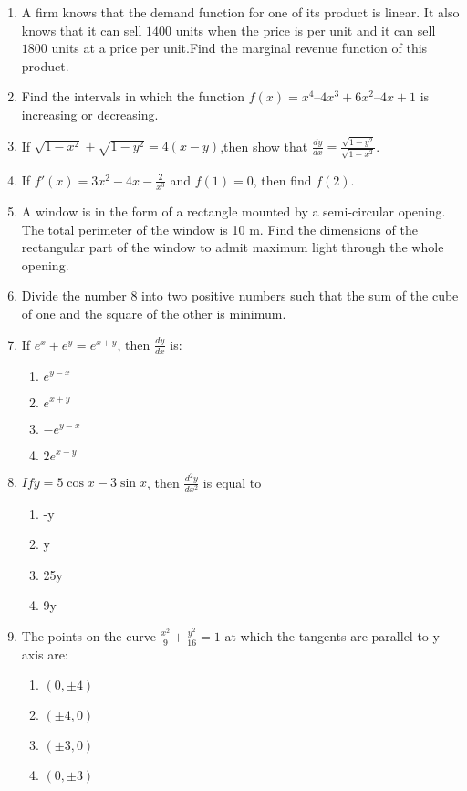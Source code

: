 \begin{enumerate}

\item A firm knows that the demand function for one of its product is linear. It also knows that it can sell $1400$ units when the price is  per unit and it can sell $1800$ units at a price  per unit.Find the marginal revenue function of this product.

\item Find the intervals in which the function $f(x) = x^{4}–4x^{3}+6x^{2}–4x+1$ is increasing or decreasing.

\item If $\sqrt{1-x^{2}}+\sqrt{1-y^{2}}=4(x-y)$,then show that $\frac{dy}{dx}=\frac{\sqrt{1-y^{2}}}{\sqrt{1-x^{2}}}$.


\item If $f'(x)=3x^{2}-4x-\frac{2}{x^{3}}$ and $f(1)=0$, then find $f(2)$.

\item A window is in the form of a rectangle mounted by a semi-circular opening. The total perimeter of the window is 10 m. Find the dimensions of the rectangular part of the window to admit maximum light through the whole opening.

\item Divide the number 8 into two positive numbers such that the sum of the cube of one and the square of the other is minimum.

\item If $e^{x}+e^{y}=e^{x+y}$, then $\frac{dy}{dx}$ is:
\begin{enumerate}
\item $e^{y-x}$
\item $e^{x+y}$
\item $-e^{y-x}$
\item $2 e^{x-y}$
\end{enumerate}

\item $If y=5\cos x-3\sin x$, then $\frac{d^{2}y}{dx^{2}}$ is equal to
\begin{enumerate}
\item -y
\item y
\item 25y
\item 9y
\end{enumerate}

\item The points on the curve $\frac{x^2}{9}+\frac{y^2}{16}=1$ at which the tangents are parallel to y-axis are:
\begin{enumerate}

\item $(0,\pm 4)$
\item $(\pm 4,0)$
\item $(\pm 3,0)$
\item $(0,\pm 3)$

\end{enumerate}

\end{enumerate}
